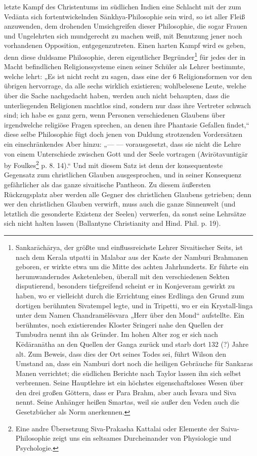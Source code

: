 \documentclass{article}
\begin{document}
letzte Kampf des Christentums im südlichen Indien eine Schlacht mit der zum Ved\={a}nta sich fortentwickelnden S\={a}nkhya-Philosophie sein wird, so ist aller Fleiß anzuwenden, dem drohenden Umsichgreifen dieser Philosophie, die sogar Frauen und Ungelehrten sich mundgerecht zu machen weiß, mit Benutzung jener noch vorhandenen Opposition, entgegenzutreten. Einen harten Kampf wird es geben, denn diese duldsame Philosophie, deren eigentlicher Begründer\footnote{Sankar\={a}ch\={a}rya, der größte und einflussreichste Lehrer Sivaitischer Seits, ist nach dem Kerala utpatti in Malabar aus der Kaste der Namburi Brahmanen geboren, er wirkte etwa um die Mitte des achten Jahrhunderts. Er führte ein herumwanderndes Asketenleben, überall mit den verschiedenen Sekten disputierend, besonders tiefgreifend scheint er in Konjeveram gewirkt zu haben, wo er vielleicht durch die Errichtung eines Erdlinga den Grund zum dortigen berühmten Sivatempel legte, und in Tripetti, wo er ein Krystall-linga unter dem Namen Chandram\={e}l\={e}svara „Herr über den Mond“ aufstellte. Ein berühmtes, noch existierendes Kloster Sringeri nahe den Quellen der Tumbudra nennt ihn als Gründer. Im hohen Alter zog er sich nach K\={e}d\={a}ran\={a}tha an den Quellen der Ganga zurück und starb dort 132 (?) Jahre alt. Zum Beweis, dass dies der Ort seines Todes sei, führt Wilson den Umstand an, dass ein Namburi dort noch die heiligen Gebräuche für Sankaras Manen verrichtet; die südlichen Berichte nach Taylor lassen ihn sich selbst verbrennen. Seine Hauptlehre ist ein höchstes eigenschaftsloses Wesen über den drei großen Göttern, dass er Para Brahm, aber auch \={I}svara und Siva nennt. Seine Anhänger heißen Smartas, weil sie außer den Veden auch die Gesetzbücher als Norm anerkennen.} für jedes der in Macht befindlichen Religionssysteme einen seiner Schüler als Lehrer bestimmte, welche lehrt: „Es ist nicht recht zu sagen, dass eine der 6 Religionsformen vor den übrigen hervorrage, da alle sechs wirklich existieren; wohlbelesene Leute, welche über die Sache nachgedacht haben, werden auch nicht behaupten, dass die unterliegenden Religionen machtlos sind, sondern nur dass ihre Vertreter schwach sind; ich habe es ganz gern, wenn Personen verschiedenen Glaubens über irgendwelche religiöse Fragen sprechen, an denen ihre Phantasie Gefallen findet,“ diese selbe Philosophie fügt doch jenen von Duldung strotzenden Vordersätzen ein einschränkendes Aber hinzu: „— — vorausgesetzt, dass sie nicht die Lehre von einem Unterschiede zwischen Gott und der Seele vortragen (Avir\={o}tavuntig\={a}r by Foulkes\footnote{Eine andre Übersetzung Siva-Prakasha Kattalai oder Elemente der Saiva-Philosophie zeigt uns ein seltsames Durcheinander von Physiologie und Psychologie.} p. 8. 14).“ Und mit diesem Satz ist denn der konsequenteste Gegensatz zum christlichen Glauben ausgesprochen, und in seiner Konsequenz gefährlicher als das ganze sivaitische Pantheon. Zu diesem äußersten Rückzugsplatz aber werden alle Gegner des christlichen Glaubens getrieben; denn wer den christlichen Glauben verwirft, muss auch die ganze Sinnenwelt (und letztlich die gesonderte Existenz der Seelen) verwerfen, da sonst seine Lehrsätze sich nicht halten lassen (Ballantyne Christianity and Hind. Phil. p. 19).
\end{document}
